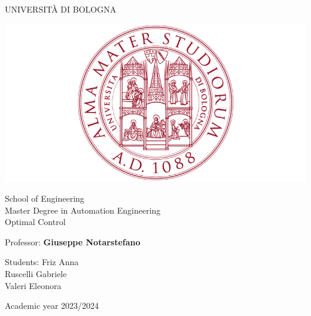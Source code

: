 \documentclass[a4paper,11pt,oneside]{book}
\begin{document}
\pagestyle{myheadings}

\thispagestyle{empty}                                                 
\begin{center}                                                            
    \vspace{5mm}
    {\LARGE UNIVERSIT\`A DI BOLOGNA} \\                       
      \vspace{5mm}
\end{center}
\begin{center}
  \includegraphics[scale=.27]{pictures/logo_unibo}
\end{center}
\begin{center}
      \vspace{5mm}
      {\LARGE School of Engineering} \\
        \vspace{3mm}
      {\Large Master Degree in Automation Engineering} \\
      \vspace{20mm}
      {\LARGE Optimal Control} \\

      \vspace{15mm}
\end{center}
\begin{flushleft}                                                                              
     {\large Professor: \textbf{\@ Giuseppe Notarstefano}} \\        
      \vspace{13mm}
\end{flushleft}
\begin{flushright}
      {\large Students:} Friz Anna\\
      Ruscelli Gabriele\\
      Valeri Eleonora
\end{flushright}        %
\begin{center}
\vfill
      {\large Academic year \@2023/2024} \\
\end{center}
\end{document}
